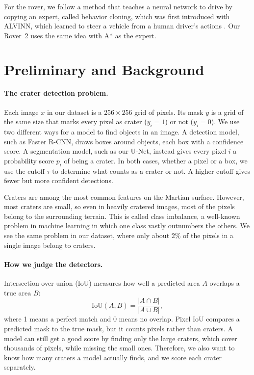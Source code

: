 \documentclass{article} %
\begin{document}
For the rover, we follow a method that teaches a neural network to drive by copying an expert, called behavior cloning, which was first introduced with ALVINN, which learned to steer a vehicle from a human driver's actions \cite{pomerleau1989, pomerleau1991}. Our Rover~2 uses the same idea with A* as the expert.
\vspace{-10pt}
\section{Preliminary and Background}
\label{sec:background}


\paragraph{The crater detection problem.}
Each image $x$ in our dataset is a $256 \times 256$ grid of pixels. Its mask $y$ is a grid of the same size that marks every pixel as crater ($y_i = 1$) or not ($y_i = 0$). We use two different ways for a model to find objects in an image. A detection model, such as Faster R-CNN, draws boxes around objects, each box with a confidence score. A segmentation model, such as our U-Net, instead gives every pixel $i$ a probability score $p_i$ of being a crater. In both cases, whether a pixel or a box, we use the cutoff $\tau$ to determine what counts as a crater or not. A higher cutoff gives fewer but more confident detections.

Craters are among the most common features on the Martian surface. However, most craters are small, so even in heavily cratered images, most of the pixels belong to the surrounding terrain. This is called class imbalance, a well-known problem in machine learning in which one class vastly outnumbers the others. We see the same problem in our dataset, where only about 2\% of the pixels in a single image belong to craters.

\paragraph{How we judge the detectors.}
Intersection over union (IoU) measures how well a predicted area $A$ overlaps a true area $B$:
\begin{equation}
\text{IoU}(A, B) = \frac{|A \cap B|}{|A \cup B|},
\end{equation}
where 1 means a perfect match and 0 means no overlap. Pixel IoU compares a predicted mask to the true mask, but it counts pixels rather than craters. A model can still get a good score by finding only the large craters, which cover thousands of pixels, while missing the small ones. Therefore, we also want to know how many craters a model actually finds, and we score each crater separately.
\end{document}
